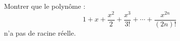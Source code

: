 Montrer que le polynôme :
\[
1 + x + \frac{x^2}{2} + \frac{x^3}{3!} + \cdots + \frac{x^{2n}}{(2n)!}
\]
n'a pas de racine réelle.
